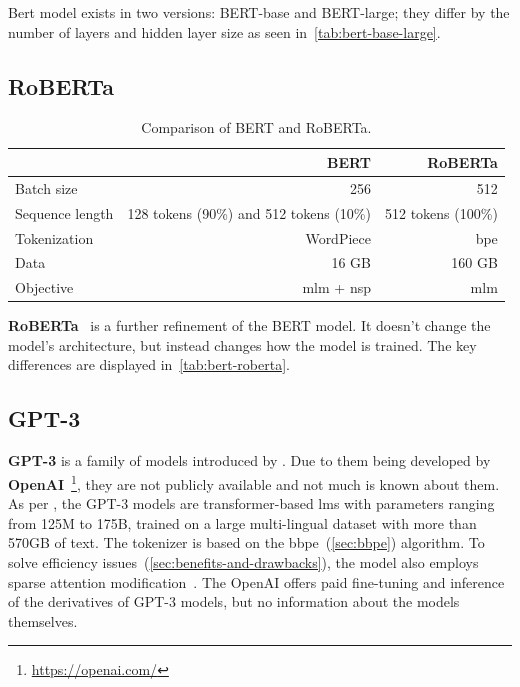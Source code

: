 Bert model exists in two versions: BERT-base and BERT-large;
they differ by the number of layers and hidden layer size as seen in~\autoref{tab:bert-base-large}.


\subsection{RoBERTa}

\begin{table}[h]
\centering\footnotesize\sf
    \begin{tabular}{lrr}
        \toprule
        {}              & BERT                                    & RoBERTa            \\
        \midrule
        Batch size      & 256                                     & 512                \\
        Sequence length & 128 tokens (90\%) and 512 tokens (10\%) & 512 tokens (100\%) \\
        Tokenization    & WordPiece                               & \ac{bpe}           \\
        Data            & 16 GB                                   & 160 GB             \\
        Objective       & \ac{mlm} + \ac{nsp}                     & \ac{mlm}           \\
        \bottomrule
    \end{tabular}
    \caption{Comparison of BERT and RoBERTa.}
    \label{tab:bert-roberta}
\end{table}

\textbf{RoBERTa}~\parencite{liuRoBERTaRobustlyOptimized2019} is a further refinement of the BERT model.
It doesn't change the model's architecture, but instead changes how the model is trained.
The key differences are displayed in~\autoref{tab:bert-roberta}.

\subsection{GPT-3}
\textbf{GPT-3} is a family of models introduced by \textcite{brownLanguageModelsAre2020b}.
Due to them being developed by \textbf{OpenAI}~\footnote{\url{https://openai.com/}}, they are not publicly available and not much is known about them.
As per \textcite{brownLanguageModelsAre2020b}, the GPT-3 models are transformer-based \acp{lm} with parameters ranging from 125M to 175B, trained on
a large multi-lingual dataset with more than 570GB of text. The tokenizer is based on the \ac{bbpe}~(\autoref{sec:bbpe}) algorithm.
To solve efficiency issues~(\autoref{sec:benefits-and-drawbacks}), the model also employs sparse attention modification~\parencite{childGeneratingLongSequences2019}.
The OpenAI offers paid fine-tuning and inference of the derivatives of GPT-3 models, but no information about the models themselves.

